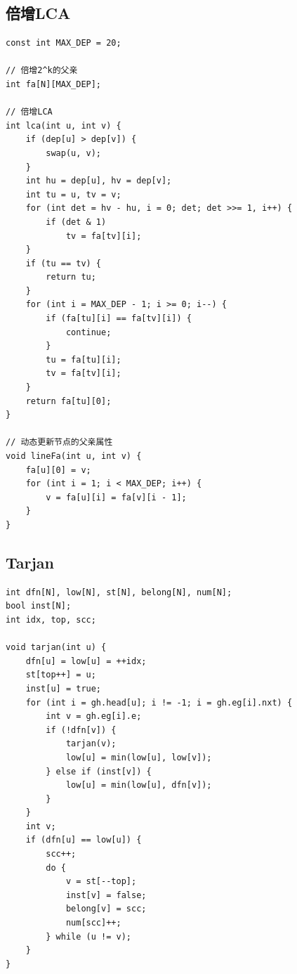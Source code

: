 \documentclass[twoside]{article}
\begin{document}
\subsection{倍增LCA}
\begin{lstlisting}
const int MAX_DEP = 20;

// 倍增2^k的父亲
int fa[N][MAX_DEP];

// 倍增LCA
int lca(int u, int v) {
    if (dep[u] > dep[v]) {
        swap(u, v);
    }
    int hu = dep[u], hv = dep[v];
    int tu = u, tv = v;
    for (int det = hv - hu, i = 0; det; det >>= 1, i++) {
        if (det & 1)
            tv = fa[tv][i];
    }
    if (tu == tv) {
        return tu;
    }
    for (int i = MAX_DEP - 1; i >= 0; i--) {
        if (fa[tu][i] == fa[tv][i]) {
            continue;
        }
        tu = fa[tu][i];
        tv = fa[tv][i];
    }
    return fa[tu][0];
}

// 动态更新节点的父亲属性
void lineFa(int u, int v) {
    fa[u][0] = v;
    for (int i = 1; i < MAX_DEP; i++) {
        v = fa[u][i] = fa[v][i - 1];
    }
}\end{lstlisting}
\subsection{Tarjan}
\begin{lstlisting}
int dfn[N], low[N], st[N], belong[N], num[N];
bool inst[N];
int idx, top, scc;

void tarjan(int u) {
    dfn[u] = low[u] = ++idx;
    st[top++] = u;
    inst[u] = true;
    for (int i = gh.head[u]; i != -1; i = gh.eg[i].nxt) {
        int v = gh.eg[i].e;
        if (!dfn[v]) {
            tarjan(v);
            low[u] = min(low[u], low[v]);
        } else if (inst[v]) {
            low[u] = min(low[u], dfn[v]);
        }
    }
    int v;
    if (dfn[u] == low[u]) {
        scc++;
        do {
            v = st[--top];
            inst[v] = false;
            belong[v] = scc;
            num[scc]++;
        } while (u != v);
    }
}\end{lstlisting}
\end{document}

